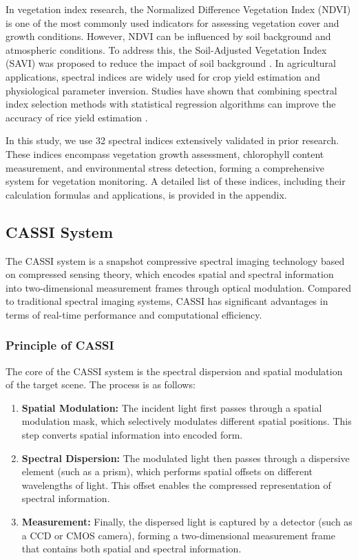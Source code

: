 \documentclass[preprint,review,12pt]{elsarticle}
\begin{document}
In vegetation index research, the Normalized Difference Vegetation Index (NDVI) is one of the most commonly used indicators for assessing vegetation cover and growth conditions. However, NDVI can be influenced by soil background and atmospheric conditions. To address this, the Soil-Adjusted Vegetation Index (SAVI) was proposed to reduce the impact of soil background \cite{huete1988}. In agricultural applications, spectral indices are widely used for crop yield estimation and physiological parameter inversion. Studies have shown that combining spectral index selection methods with statistical regression algorithms can improve the accuracy of rice yield estimation \cite{wang2021}.

In this study, we use 32 spectral indices extensively validated in prior research. These indices encompass vegetation growth assessment, chlorophyll content measurement, and environmental stress detection, forming a comprehensive system for vegetation monitoring. A detailed list of these indices, including their calculation formulas and applications, is provided in the appendix.

\subsection{CASSI System}
\label{sec:cassi}

The CASSI system is a snapshot compressive spectral imaging technology based on compressed sensing theory, which encodes spatial and spectral information into two-dimensional measurement frames through optical modulation. Compared to traditional spectral imaging systems, CASSI has significant advantages in terms of real-time performance and computational efficiency.

\subsubsection{Principle of CASSI}

The core of the CASSI system is the spectral dispersion and spatial modulation of the target scene. The process is as follows:

\begin{enumerate}
	\item \textbf{Spatial Modulation:} The incident light first passes through a spatial modulation mask, which selectively modulates different spatial positions. This step converts spatial information into encoded form.
	\item \textbf{Spectral Dispersion:} The modulated light then passes through a dispersive element (such as a prism), which performs spatial offsets on different wavelengths of light. This offset enables the compressed representation of spectral information.
	\item \textbf{Measurement:} Finally, the dispersed light is captured by a detector (such as a CCD or CMOS camera), forming a two-dimensional measurement frame that contains both spatial and spectral information.
\end{enumerate}
\end{document}
